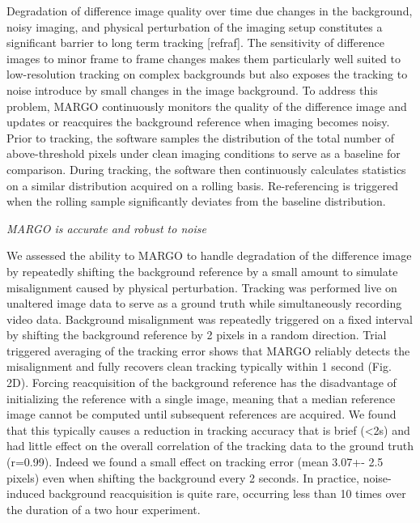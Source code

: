 \documentclass[10pt]{article}
\begin{document}
\begin{multicols}{2}
Degradation of difference image quality over time due changes in the background, noisy imaging, and physical perturbation of the imaging setup constitutes a significant barrier to long term tracking [refraf]. The sensitivity of difference images to minor frame to frame changes makes them particularly well suited to low-resolution tracking on complex backgrounds but also exposes the tracking to noise introduce by small changes in the image background. To address this problem, MARGO continuously monitors the quality of the difference image and updates or reacquires the background reference when imaging becomes noisy. Prior to tracking, the software samples the distribution of the total number of above-threshold pixels under clean imaging conditions to serve as a baseline for comparison.  During tracking, the software then continuously calculates statistics on a similar distribution acquired on a rolling basis.  Re-referencing is triggered when the rolling sample significantly deviates from the baseline distribution.

\textit{MARGO is accurate and robust to noise}

We assessed the ability to MARGO to handle degradation of the difference image by repeatedly shifting the background reference by a small amount to simulate misalignment caused by physical perturbation. Tracking was performed live on unaltered image data to serve as a ground truth while simultaneously recording video data. Background misalignment was repeatedly triggered on a fixed interval by shifting the background reference by 2 pixels in a random direction. Trial triggered averaging of the tracking error shows that MARGO reliably detects the misalignment and fully recovers clean tracking typically within 1 second (Fig. 2D). Forcing reacquisition of the background reference has the disadvantage of initializing the reference with a single image, meaning that a median reference image cannot be computed until subsequent references are acquired. We found that this typically causes a reduction in tracking accuracy that is brief (<2s) and had little effect on the overall correlation of the tracking data to the ground truth (r=0.99). Indeed we found a small effect on tracking error (mean 3.07+- 2.5 pixels) even when shifting the background every 2 seconds. In practice, noise-induced background reacquisition is quite rare, occurring less than 10 times over the duration of a two hour experiment.


\end{multicols}
\end{document}
